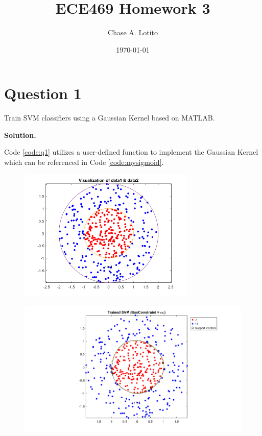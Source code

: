 \documentclass[11pt]{article}
\title{\textbf{ECE469 Homework 3}}
\author{Chase A. Lotito}
\date{\today}
\begin{document}

\maketitle

\section*{Question 1}

Train SVM classifiers using a Gaussian Kernel based on MATLAB.

\smallskip
\textbf{Solution.}



Code \ref{code:q1} utilizes a user-defined function to implement the Gaussian Kernel which can be referenced in Code \ref{code:mysigmoid}.


\begin{figure}[!h]
  \centering
  \includegraphics[width=0.75\textwidth]{../q1/data1_data2_visualization.png}
  \label{fig:q1_data_visual}
\end{figure}

\begin{figure}[!h]
  \centering
  \includegraphics[width=1.0\textwidth]{../q1/trained_svm_inf.png}
  \label{fig:trained_svm_inf}
\end{figure}
\end{document}
